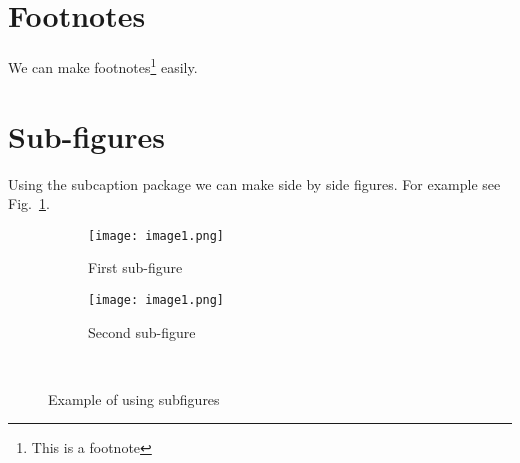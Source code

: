 \section{Footnotes}
We can make footnotes\footnote{This is a footnote} easily.

\section{Sub-figures}
Using the subcaption package we can make side by side figures.
For example see Fig.~\ref{fig:subfigureexample}.

\begin{figure}[h]
\centering
    \begin{subfigure}[t]{0.45\textwidth}
    \centering
        \texttt{[image: image1.png]}
    \caption{First sub-figure}
    \end{subfigure}
\hfill
    \begin{subfigure}[t]{0.45\textwidth}\centering
    \centering
        \texttt{[image: image1.png]}
    \caption{Second sub-figure}
    \end{subfigure}
~
\caption{Example of using subfigures}
\label{fig:subfigureexample}
\end{figure}

